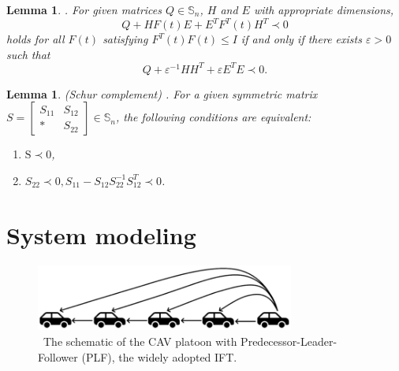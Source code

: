 \documentclass[journal]{IEEEtran}
\newtheorem{lemma}[theorem]{Lemma}
\begin{document}
\begin{lemma}
  \label{lemmaX1}
  \citep{petersen1986riccati}. For given matrices $Q\in\mathbb{S}_n$, $H$ and $E$ with appropriate dimensions,
  \begin{equation*}
    Q + HF(t)E + {E^{T}}{F^{T}}(t){H^{T}} \prec 0
  \end{equation*}
  holds for all $F(t)$ satisfying $F^T(t)F(t)\le I$ if and only if there exists $\varepsilon>0$ such that
  \begin{equation*}
    Q + {\varepsilon ^{ - 1}}H{H^{T}} + \varepsilon {E^{T}}E \prec 0.
  \end{equation*}
\end{lemma}

\begin{lemma}
  \label{lemmaX2}
  (Schur complement) \citep{boyd1994linear}. For a given symmetric matrix $S = \left[ {\begin{array}{*{20}{l}}
            {{S_{11}}} & {{S_{12}}} \\
            *          & {{S_{22}}}
          \end{array}} \right] \in \mathbb{S}{_n}$, the following conditions are equivalent:
  \begin{enumerate}
    \item ${\text{S}} \prec 0$,
    \item ${S_{22}} \prec 0,{S_{11}} - {S_{12}}S_{22}^{ - 1}S_{12}^{T} \prec 0$.
  \end{enumerate}
\end{lemma}


\section{System modeling}
\label{Section 3}

\begin{figure}
  \centering

  \includegraphics[width=8.5cm]{figs/fig1.png}
  \caption{~The schematic of the CAV platoon with Predecessor-Leader-Follower (PLF), the widely adopted IFT.}
  \label{fig1}
\end{figure}
\end{document}
